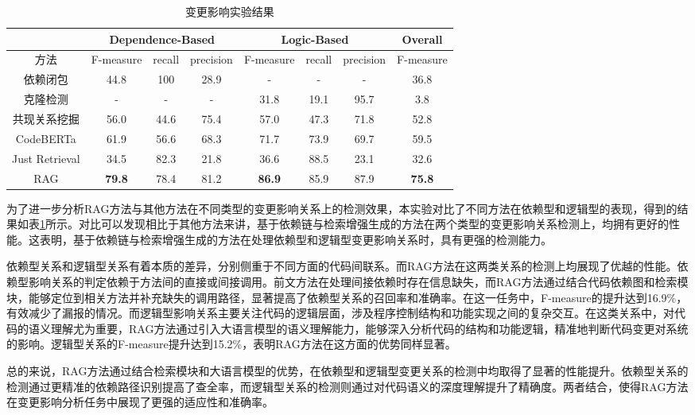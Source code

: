 \begin{table}[htbp]
\caption{变更影响实验结果}
\label{2_变更影响实验结果}
\vspace{0.5em}\centering\wuhao
\begin{tabular}{c|ccc|ccc|c}
\toprule
  & \multicolumn{3}{c|}{Dependence-Based} & \multicolumn{3}{c|}{Logic-Based} & Overall \\
\midrule
方法 & F-measure & recall & precision & F-measure & recall & precision  
 & F-measure\\
\midrule
依赖闭包 &  44.8 & 100 & 28.9 & - & - & - & 36.8 \\
克隆检测 &  - & - & - & 31.8 & 19.1 & 95.7 & 3.8\\
共现关系挖掘 &  56.0 & 44.6 & 75.4 & 57.0 & 47.3 & 71.8 & 52.8\\
CodeBERTa  &   61.9 & 56.6 & 68.3 & 71.7 & 73.9 & 69.7 &59.5\\
Just Retrieval   & 34.5 & 82.3 & 21.8 & 36.6 & 88.5 & 23.1 & 32.6\\
RAG & \textbf{79.8} & 78.4 & 81.2 & \textbf{86.9} & 85.9 & 87.9 & \textbf{75.8}\\
\bottomrule
\end{tabular}
\end{table}

为了进一步分析RAG方法与其他方法在不同类型的变更影响关系上的检测效果，本实验对比了不同方法在依赖型和逻辑型的表现，得到的结果如表\ref{2_变更影响实验结果}所示。对比可以发现相比于其他方法来讲，基于依赖链与检索增强生成的方法在两个类型的变更影响关系检测上，均拥有更好的性能。这表明，基于依赖链与检索增强生成的方法在处理依赖型和逻辑型变更影响关系时，具有更强的检测能力。

依赖型关系和逻辑型关系有着本质的差异，分别侧重于不同方面的代码间联系。而RAG方法在这两类关系的检测上均展现了优越的性能。依赖型影响关系的判定依赖于方法间的直接或间接调用。前文方法在处理间接依赖时存在信息缺失，而RAG方法通过结合代码依赖图和检索模块，能够定位到相关方法并补充缺失的调用路径，显著提高了依赖型关系的召回率和准确率。在这一任务中，F-measure的提升达到16.9\%，有效减少了漏报的情况。而逻辑型影响关系主要关注代码的逻辑层面，涉及程序控制结构和功能实现之间的复杂交互。在这类关系中，对代码的语义理解尤为重要，RAG方法通过引入大语言模型的语义理解能力，能够深入分析代码的结构和功能逻辑，精准地判断代码变更对系统的影响。逻辑型关系的F-measure提升达到15.2\%，表明RAG方法在这方面的优势同样显著。

总的来说，RAG方法通过结合检索模块和大语言模型的优势，在依赖型和逻辑型变更关系的检测中均取得了显著的性能提升。依赖型关系的检测通过更精准的依赖路径识别提高了查全率，而逻辑型关系的检测则通过对代码语义的深度理解提升了精确度。两者结合，使得RAG方法在变更影响分析任务中展现了更强的适应性和准确率。

